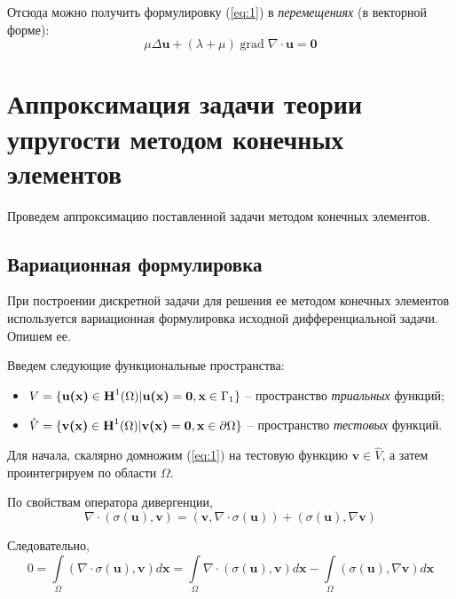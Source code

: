 \documentclass[a4paper, 14pt]{extreport}
\DeclareMathOperator{\grad}{grad}
\begin{document}
Отсюда  можно получить формулировку (\ref{eq:1}) в \textit{перемещениях} (в векторной форме):
\begin{equation}
	\label{eq: 2}
	\mu\Delta\textbf{u} + (\lambda + \mu)\grad\!\nabla\!\cdot\!\textbf{u} = \textbf{0}
\end{equation}

\chapter{Аппроксимация задачи теории упругости методом конечных элементов}

Проведем аппроксимацию поставленной задачи методом
конечных элементов.
\section{ Вариационная формулировка}
При построении дискретной задачи для решения ее методом конечных элементов 
используется вариационная формулировка исходной дифференциальной задачи.
Опишем ее.

Введем следующие функциональные пространства:
\begin{itemize}
	\item $V = \{ \textbf{u(\textbf{x})} \in \textbf{H}^1(\Omega) \vert \textbf{u(\textbf{x})} = \textbf{0}, \textbf{x} \in \Gamma_1 \}$ --
	пространство \textit{триальных} функций;
	\item $\hat{V} = \{ \textbf{v(\textbf{x})} \in \textbf{H}^1(\Omega) \vert \textbf{v(\textbf{x})} = \textbf{0}, \textbf{x} \in \partial\Omega \}$ --
	пространство \textit{тестовых} функций.	
\end{itemize}

Для начала, скалярно домножим (\ref{eq:1}) на тестовую функцию $\textbf{v} \in \hat{V}$, 
а затем проинтегрируем по области $\Omega$.

По свойствам оператора дивергенции,
\begin{equation}
	\label{eq: 3}
	\nabla\!\cdot\!(\sigma(\textbf{u}), \textbf{v}) = (\textbf{v}, \nabla\!\cdot\!\sigma(\textbf{u})) +
		(\sigma(\textbf{u}), \nabla\textbf{v})
\end{equation}

Следовательно,
\begin{equation}
	\label{eq: 4}
	0 = \int\limits_\Omega{(\nabla\!\cdot\!\sigma(\textbf{u}), \textbf{v})}d\textbf{x} = 
		\int\limits_\Omega{\nabla\!\cdot\!(\sigma(\textbf{u}), \textbf{v})}d\textbf{x} - 
		\int\limits_\Omega{(\sigma(\textbf{u}), \nabla \textbf{v})}d\textbf{x}
\end{equation}
\end{document}
